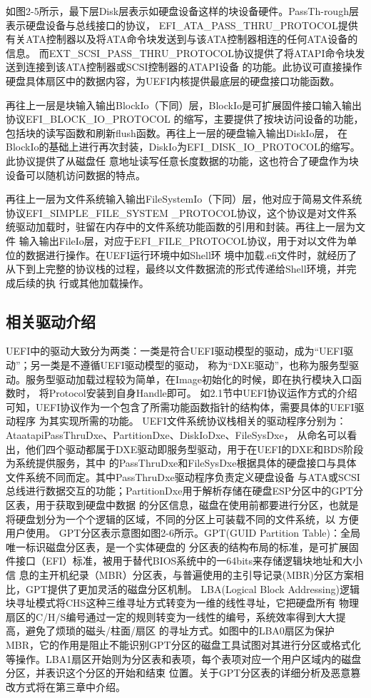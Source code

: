 如图2-5所示，最下层Disk层表示如硬盘设备这样的块设备硬件。PassTh-\newline rough层表示硬盘设备与总线接口的协议，
EFI\_ATA\_PASS\_THRU\_PROTOCOL提供有关ATA控制器以及将ATA命令块发送到与该ATA控制器相连的任何ATA设备的信息。
而EXT\_SCSI\_PASS\_THRU\_PROTOCOL协议提供了将ATAPI命令块发送到连接到该ATA控制器或SCSI控制器的ATAPI设备
的功能。此协议可直接操作硬盘具体扇区中的数据内容，为UEFI内核提供最底层的硬盘接口功能函数。
\par 再往上一层是块输入输出BlockIo（下同）层，BlockIo是可扩展固件接口输入输出协议EFI\_BLOCK\_IO\_PROTOCOL
的缩写，主要提供了按块访问设备的功能，包括块的读写函数和刷新flush函数。再往上一层的硬盘输入输出DiskIo层，
在BlockIo的基础上进行再次封装，DiskIo为EFI\_DISK\_IO\_PROTOCOL的缩写。此协议提供了从磁盘任
意地址读写任意长度数据的功能，这也符合了硬盘作为块设备可以随机访问数据的特点。
\par 再往上一层为文件系统输入输出FileSystemIo（下同）层，他对应于简易文件系统协议EFI\_SIMPLE\_FILE\_SYSTEM
\_PROTOCOL协议，这个协议是对文件系统驱动加载时，驻留在内存中的文件系统功能函数的引用和封装。再往上一层为文件
输入输出FileIo层，对应于EFI\_FILE\_PROTOCOL协议，用于对以文件为单位的数据进行操作。在UEFI运行环境中如Shell环
境中加载.efi文件时，就经历了从下到上完整的协议栈的过程，最终以文件数据流的形式传递给Shell环境，并完成后续的执
行或其他加载操作。

\subsection{相关驱动介绍}
UEFI中的驱动大致分为两类：一类是符合UEFI驱动模型的驱动，成为“UEFI驱动”；另一类是不遵循UEFI驱动模型的驱动，
称为“DXE驱动”，也称为服务型驱动。服务型驱动加载过程较为简单，在Image初始化的时候，即在执行模块入口函数时，
将Protocol安装到自身Handle即可。
如2.1节中UEFI协议运作方式的介绍可知，UEFI协议作为一个包含了所需功能函数指针的结构体，需要具体的UEFI驱动程序
为其实现所需的功能。
UEFI文件系统协议栈相关的驱动程序分别为：AtaatapiPassThruDxe、PartitionDxe、DiskIoDxe、FileSysDxe，
从命名可以看出，他们四个驱动都属于DXE驱动即服务型驱动，用于在UEFI的DXE和BDS阶段为系统提供服务，其中
的PassThruDxe和FileSysDxe根据具体的硬盘接口与具体文件系统不同而定。其中PassThruDxe驱动程序负责定义硬盘设备
与ATA或SCSI总线进行数据交互的功能；PartitionDxe用于解析存储在硬盘ESP分区中的GPT分区表，用于获取到硬盘中数据
的分区信息，磁盘在使用前都要进行分区，也就是将硬盘划分为一个个逻辑的区域，不同的分区上可装载不同的文件系统，以
方便用户使用。
GPT分区表示意图如图2-6所示。GPT(GUID Partition Table)：全局唯一标识磁盘分区表\cite{extra3}，是一个实体硬盘的
分区表的结构布局的标准，是可扩展固件接口（EFI）标准，被用于替代BIOS系统中的一64bits来存储逻辑块地址和大小信
息的主开机纪录（MBR）分区表，与普遍使用的主引导记录(MBR)分区方案相比，GPT提供了更加灵活的磁盘分区机制。
LBA(Logical Block Addressing)逻辑块寻址模式将CHS这种三维寻址方式转变为一维的线性寻址，它把硬盘所有
物理扇区的C/H/S编号通过一定的规则转变为一线性的编号，系统效率得到大大提高，避免了烦琐的磁头/柱面/扇区
的寻址方式。如图中的LBA0扇区为保护MBR，它的作用是阻止不能识别GPT分区的磁盘工具试图对其进行分区或格式化
等操作。LBA1扇区开始则为分区表和表项，每个表项对应一个用户区域内的磁盘分区，并表识这个分区的开始和结束
位置。关于GPT分区表的详细分析及恶意篡改方式将在第三章中介绍。

